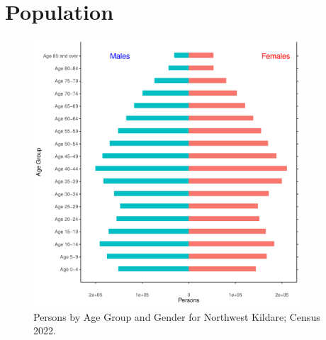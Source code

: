 \documentclass{article}
\begin{document}
\pagebreak

\section{Population} 
\label{sect:Pop}

\begin{figure}[h]
	\centering
	\includegraphics[width = 100mm]{../figures/PyramidPlot.pdf}
	\caption{Persons by Age Group and Gender for Northwest Kildare; Census 2022.}
	\label{fig:2ae19629-1a6a-13a3-e055-000000000001}
	\end{figure}
\end{document}
